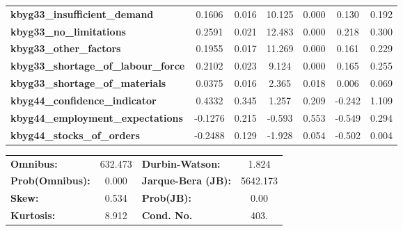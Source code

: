 \begin{center}
\begin{tabular}{lcccccc}
\textbf{kbyg33\_insufficient\_demand}        &       0.1606  &        0.016     &    10.125  &         0.000        &        0.130    &        0.192     \\
\textbf{kbyg33\_no\_limitations}             &       0.2591  &        0.021     &    12.483  &         0.000        &        0.218    &        0.300     \\
\textbf{kbyg33\_other\_factors}              &       0.1955  &        0.017     &    11.269  &         0.000        &        0.161    &        0.229     \\
\textbf{kbyg33\_shortage\_of\_labour\_force} &       0.2102  &        0.023     &     9.124  &         0.000        &        0.165    &        0.255     \\
\textbf{kbyg33\_shortage\_of\_materials}     &       0.0375  &        0.016     &     2.365  &         0.018        &        0.006    &        0.069     \\
\textbf{kbyg44\_confidence\_indicator}       &       0.4332  &        0.345     &     1.257  &         0.209        &       -0.242    &        1.109     \\
\textbf{kbyg44\_employment\_expectations}    &      -0.1276  &        0.215     &    -0.593  &         0.553        &       -0.549    &        0.294     \\
\textbf{kbyg44\_stocks\_of\_orders}          &      -0.2488  &        0.129     &    -1.928  &         0.054        &       -0.502    &        0.004     \\
\bottomrule
\end{tabular}
\begin{tabular}{lclc}
\textbf{Omnibus:}       & 632.473 & \textbf{  Durbin-Watson:     } &    1.824  \\
\textbf{Prob(Omnibus):} &   0.000 & \textbf{  Jarque-Bera (JB):  } & 5642.173  \\
\textbf{Skew:}          &   0.534 & \textbf{  Prob(JB):          } &     0.00  \\
\textbf{Kurtosis:}      &   8.912 & \textbf{  Cond. No.          } &     403.  \\
\bottomrule
\end{tabular}
\end{center}